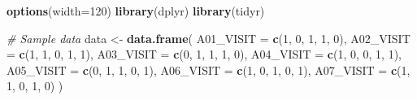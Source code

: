 \documentclass[
]{article}
\newenvironment{Shaded}{\begin{snugshade}}{\end{snugshade}}
\newcommand{\AttributeTok}[1]{\textcolor[rgb]{0.13,0.29,0.53}{#1}}
\newcommand{\CommentTok}[1]{\textcolor[rgb]{0.56,0.35,0.01}{\textit{#1}}}
\newcommand{\DecValTok}[1]{\textcolor[rgb]{0.00,0.00,0.81}{#1}}
\newcommand{\FunctionTok}[1]{\textcolor[rgb]{0.13,0.29,0.53}{\textbf{#1}}}
\newcommand{\NormalTok}[1]{#1}
\newcommand{\OtherTok}[1]{\textcolor[rgb]{0.56,0.35,0.01}{#1}}
\begin{document}
\begin{Shaded}
\begin{Highlighting}[]
\FunctionTok{options}\NormalTok{(}\AttributeTok{width=}\DecValTok{120}\NormalTok{)}
\FunctionTok{library}\NormalTok{(dplyr)}
\FunctionTok{library}\NormalTok{(tidyr)}

\CommentTok{\# Sample data}
\NormalTok{data }\OtherTok{\textless{}{-}} \FunctionTok{data.frame}\NormalTok{(}
  \AttributeTok{A01\_VISIT =} \FunctionTok{c}\NormalTok{(}\DecValTok{1}\NormalTok{, }\DecValTok{0}\NormalTok{, }\DecValTok{1}\NormalTok{, }\DecValTok{1}\NormalTok{, }\DecValTok{0}\NormalTok{),}
  \AttributeTok{A02\_VISIT =} \FunctionTok{c}\NormalTok{(}\DecValTok{1}\NormalTok{, }\DecValTok{1}\NormalTok{, }\DecValTok{0}\NormalTok{, }\DecValTok{1}\NormalTok{, }\DecValTok{1}\NormalTok{),}
  \AttributeTok{A03\_VISIT =} \FunctionTok{c}\NormalTok{(}\DecValTok{0}\NormalTok{, }\DecValTok{1}\NormalTok{, }\DecValTok{1}\NormalTok{, }\DecValTok{1}\NormalTok{, }\DecValTok{0}\NormalTok{),}
  \AttributeTok{A04\_VISIT =} \FunctionTok{c}\NormalTok{(}\DecValTok{1}\NormalTok{, }\DecValTok{0}\NormalTok{, }\DecValTok{0}\NormalTok{, }\DecValTok{1}\NormalTok{, }\DecValTok{1}\NormalTok{),}
  \AttributeTok{A05\_VISIT =} \FunctionTok{c}\NormalTok{(}\DecValTok{0}\NormalTok{, }\DecValTok{1}\NormalTok{, }\DecValTok{1}\NormalTok{, }\DecValTok{0}\NormalTok{, }\DecValTok{1}\NormalTok{),}
  \AttributeTok{A06\_VISIT =} \FunctionTok{c}\NormalTok{(}\DecValTok{1}\NormalTok{, }\DecValTok{0}\NormalTok{, }\DecValTok{1}\NormalTok{, }\DecValTok{0}\NormalTok{, }\DecValTok{1}\NormalTok{),}
  \AttributeTok{A07\_VISIT =} \FunctionTok{c}\NormalTok{(}\DecValTok{1}\NormalTok{, }\DecValTok{1}\NormalTok{, }\DecValTok{0}\NormalTok{, }\DecValTok{1}\NormalTok{, }\DecValTok{0}\NormalTok{)}
\NormalTok{)}


\end{Highlighting}
\end{Shaded}
\end{document}
